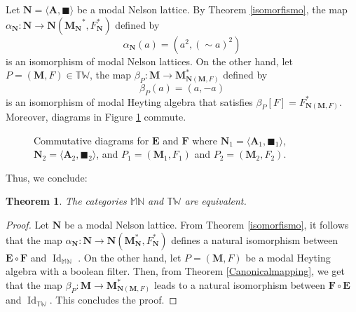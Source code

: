 \documentclass[pdflatex,sn-mathphys-num]{sn-jnl}%
\newcommand{\A}{\mathbf{A}}
\newcommand{\MN}{\mathbb{MN}}
\newcommand{\Id}{\operatorname{Id}}
\theoremstyle{thmstyleone}%
\newtheorem{theorem}{Theorem}%
\theoremstyle{thmstyletwo}%
\theoremstyle{thmstylethree}%
\begin{document}
 Let $\mathbf{N}=\langle\A,\blacksquare\rangle$ be a modal Nelson lattice. By Theorem \ref{isomorfismo}, the map $\alpha_\mathbf{N}\colon \mathbf{N}\to \mathbf{N}(\mathbf{M_\mathbf{N}}^*,F_\mathbf{N}^*)$ defined by
    \[\alpha_\mathbf{N}(a)=(a^2,(\sim a)^2)\] is an isomorphism of modal Nelson lattices. On the other hand, let $P=(\mathbf{M},F)\in \mathbb{TW}$, the map $\beta_P:\mathbf{M}\to \mathbf{M}_{\mathbf{N}(\mathbf{M},F)}^*$ defined by
    \[\beta_P(a)=(a,-a)\]
is an isomorphism of modal Heyting algebra that satisfies $\beta_P[F]=F_{\mathbf{N}(\mathbf{M},F)}^*$.
Moreover, diagrams in Figure \ref{fig:comm-diagrams} commute.
\begin{figure}[h]
    \centering
    \hspace{2cm}
    \caption{Commutative diagrams for $\mathbf{E}$ and $\mathbf{F}$ where $\mathbf{N}_1=\langle\A_1,\blacksquare_1\rangle$, $\mathbf{N}_2=\langle\A_2,\blacksquare_2\rangle$, and $P_1=( \mathbf{M}_1,F_1)$ and $P_2=( \mathbf{M}_2,F_2)$.}
    \label{fig:comm-diagrams}
\end{figure}

Thus, we conclude:
\begin{theorem}
   The categories $\MN$ and $\mathbb{TW}$ are equivalent. 
\end{theorem}

\begin{proof}
    Let $\mathbf{N} $ be a modal Nelson lattice. From Theorem \ref{isomorfismo}, it follows that
the map $\alpha_\mathbf{N} \colon \mathbf{N} \to \mathbf{N}(\mathbf{M}_\mathbf{N}^*,F_\mathbf{N}^*)$ defines a natural isomorphism between $\mathbf{E} \circ \mathbf{F}$ and
$\Id_\MN$ . On the other hand, let $P=(\mathbf{M},F)$ be a modal Heyting algebra with a boolean filter. Then, from Theorem \ref{Canonicalmapping}, we get that the map $\beta_P \colon \mathbf{M} \to \mathbf{M}_{\mathbf{N}(\mathbf{M},F)}^*$ leads
to a natural isomorphism between $\mathbf{F} \circ \mathbf{E}$ and $\Id_{\mathbb{TW}}$. This concludes the proof.
\end{proof}
\end{document}
